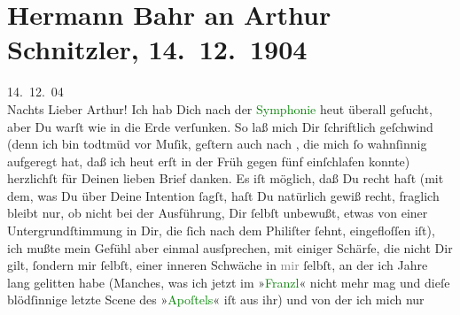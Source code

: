 

               \section[Hermann Bahr an Arthur Schnitzler, 14. 12. 1904]{ Hermann Bahr an Arthur Schnitzler, 14. 12. 1904}\nopagebreak{}\rehead{ }\normalsize\beginnumbering{} \toendnotes[C]{\smallbreak\pagebreak[2]} 
\toendnotes[C]{\smallbreak}\pstart
           \raggedleft{}{\pb}14. 12. 04{\\}Nachts\pend
           \pstart\center{}Lieber Arthur!\pend\pstart
           Ich hab Dich nach der \textcolor{green}{Symphonie}{}
               heut überall geſucht, aber Du warſt wie in die Erde verſunken. So laß mich Dir
               ſchriftlich geſchwind (denn ich bin todtmüd vor Muſik, geſtern auch nach \label{K_L01478_1v}\label{K_L01478_1h}, die mich ſo wahnſinnig aufgeregt hat, daß ich heut
               erſt in der Früh gegen fünf einſchlafen konnte) herzlichſt für Deinen lieben Brief
               danken. Es iſt möglich, daß Du recht haſt (mit dem, was Du über Deine Intention
               ſagſt, haſt Du natürlich gewiß recht, fraglich bleibt nur, ob nicht bei der
               Ausführung, Dir ſelbſt unbewußt, etwas von einer Untergrundſtimmung in Dir, die ſich
               nach dem Philiſter ſehnt, eingefloſſen iſt), ich mußte mein Gefühl aber einmal
               ausſprechen, mit einiger Schärfe, die nicht Dir gilt, ſondern mir ſelbſt, einer
               inneren Schwäche in \textcolor{gray}{mir}{ }ſelbſt, {\pb}an der
               ich Jahre lang gelitten habe (Manches, was ich jetzt im »\textcolor{green}{Franzl}{}\ledrightnote{\textcolor{green}{Der Franzl. Fünf Bilder aus dem Leben eines guten Mannes}}« nicht mehr mag und dieſe blödſinnige letzte Scene des »\textcolor{green}{Apoſtels}{}\ledrightnote{\textcolor{green}{Der Apostel}}« iſt aus ihr) und von der ich mich nur
